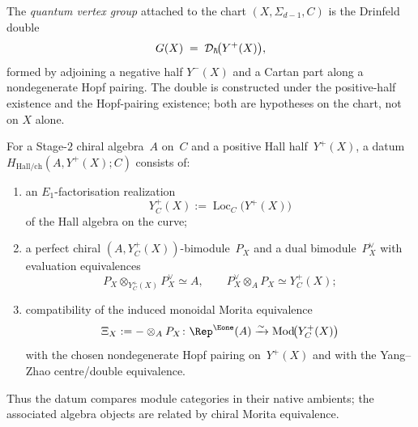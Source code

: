 \begin{definition}
\label{def:bulk-gx}
The \emph{quantum vertex group} attached to the chart $(X,
\Sigma_{d-1}, C)$ is the Drinfeld double
\[
 G(X) \;=\; \mathcal D_{\hbar}\!\bigl(Y^{+}(X)\bigr),
\]
formed by adjoining a negative half $Y^{-}(X)$ and a Cartan part along a
nondegenerate Hopf pairing. The double is constructed under the
positive-half existence and the Hopf-pairing existence; both are
hypotheses on the chart, not on $X$ alone.
\end{definition}

\begin{definition}
\label{def:bulk-hall-chiral-morita-datum}
For a Stage-$2$ chiral algebra~$A$ on~$C$ and a positive Hall
half~$Y^+(X)$, a datum
$H_{\mathrm{Hall/ch}}(A,Y^+(X);C)$ consists of:
\begin{enumerate}[label=\textup{(\alph*)}]
\item an $E_1$-factorisation realization
\[
 Y_C^+(X):=\operatorname{Loc}_C\!\bigl(Y^+(X)\bigr)
\]
of the Hall algebra on the curve;
\item a perfect chiral
$(A,Y_C^+(X))$-bimodule~$P_X$ and a dual bimodule~$P_X^\vee$ with
evaluation equivalences
\[
 P_X\mathbin{\otimes_{Y_C^+(X)}}P_X^\vee\simeq A,
 \qquad
 P_X^\vee\mathbin{\otimes_A}P_X\simeq Y_C^+(X);
\]
\item compatibility of the induced monoidal Morita equivalence
\[
 \Xi_X:=-\mathbin{\otimes_A}P_X\colon
 \Rep^{\Eone}(A)\xrightarrow{\sim}
 \operatorname{Mod}\!\bigl(Y_C^+(X)\bigr)
\]
with the chosen nondegenerate Hopf pairing on~$Y^+(X)$ and with the
Yang--Zhao centre/double equivalence.
\end{enumerate}
Thus the datum compares module categories in their native ambients;
the associated algebra objects are related by chiral Morita
equivalence.
\end{definition}

